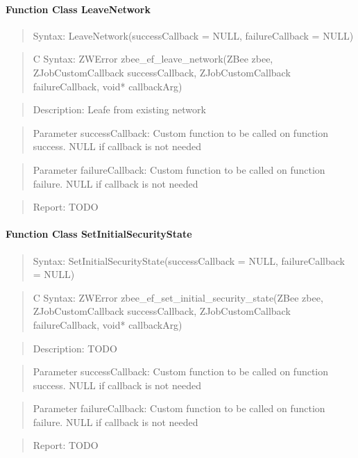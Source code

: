\paragraph{Function Class LeaveNetwork}
\begin{quote}Syntax: LeaveNetwork(successCallback = NULL, failureCallback = NULL)\end{quote}
\begin{quote}C Syntax: ZWError zbee\_ef\_leave\_network(ZBee zbee, ZJobCustomCallback successCallback, ZJobCustomCallback failureCallback, void* callbackArg)\end{quote}
\begin{quote}Description: Leafe from existing network\end{quote}
\begin{quote}Parameter successCallback: Custom function to be called on function success. NULL if callback is not needed\end{quote}
\begin{quote}Parameter failureCallback: Custom function to be called on function failure. NULL if callback is not needed\end{quote}
\begin{quote}Report: TODO\end{quote}

\paragraph{Function Class SetInitialSecurityState}
\begin{quote}Syntax: SetInitialSecurityState(successCallback = NULL, failureCallback = NULL)\end{quote}
\begin{quote}C Syntax: ZWError zbee\_ef\_set\_initial\_security\_state(ZBee zbee, ZJobCustomCallback successCallback, ZJobCustomCallback failureCallback, void* callbackArg)\end{quote}
\begin{quote}Description: TODO\end{quote}
\begin{quote}Parameter successCallback: Custom function to be called on function success. NULL if callback is not needed\end{quote}
\begin{quote}Parameter failureCallback: Custom function to be called on function failure. NULL if callback is not needed\end{quote}
\begin{quote}Report: TODO\end{quote}

